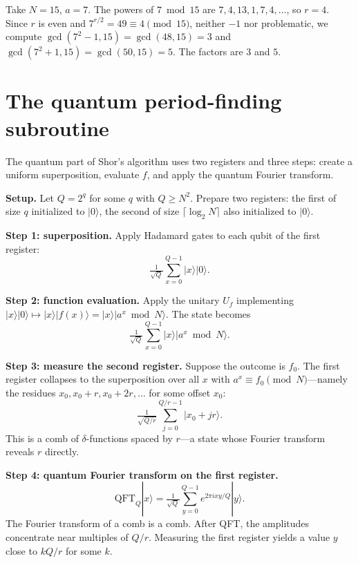 \begin{example}
Take $N = 15$, $a = 7$. The powers of $7 \bmod 15$ are $7, 4, 13, 1, 7, 4, \ldots$, so $r = 4$. Since $r$ is even and $7^{r/2} = 49 \equiv 4 \pmod{15}$, neither $-1$ nor problematic, we compute $\gcd(7^2 - 1, 15) = \gcd(48, 15) = 3$ and $\gcd(7^2+1, 15) = \gcd(50, 15) = 5$. The factors are $3$ and $5$.
\end{example}

\section{The quantum period-finding subroutine}

The quantum part of Shor's algorithm uses two registers and three steps: create a uniform superposition, evaluate $f$, and apply the quantum Fourier transform.

\textbf{Setup.} Let $Q = 2^q$ for some $q$ with $Q \geq N^2$. Prepare two registers: the first of size $q$ initialized to $|0\rangle$, the second of size $\lceil\log_2 N\rceil$ also initialized to $|0\rangle$.

\textbf{Step 1: superposition.} Apply Hadamard gates to each qubit of the first register:
\[
  \tfrac{1}{\sqrt Q}\sum_{x=0}^{Q-1} |x\rangle|0\rangle.
\]

\textbf{Step 2: function evaluation.} Apply the unitary $U_f$ implementing $|x\rangle|0\rangle \mapsto |x\rangle|f(x)\rangle = |x\rangle|a^x \bmod N\rangle$. The state becomes
\[
  \tfrac{1}{\sqrt Q}\sum_{x=0}^{Q-1} |x\rangle|a^x \bmod N\rangle.
\]

\textbf{Step 3: measure the second register.} Suppose the outcome is $f_0$. The first register collapses to the superposition over all $x$ with $a^x \equiv f_0 \pmod{N}$---namely the residues $x_0, x_0+r, x_0+2r, \ldots$ for some offset $x_0$:
\[
  \tfrac{1}{\sqrt{Q/r}}\sum_{j=0}^{Q/r - 1} |x_0 + jr\rangle.
\]
This is a comb of $\delta$-functions spaced by $r$---a state whose Fourier transform reveals $r$ directly.

\textbf{Step 4: quantum Fourier transform on the first register.}
\[
  \mathrm{QFT}_Q|x\rangle = \tfrac{1}{\sqrt Q}\sum_{y=0}^{Q-1} e^{2\pi i xy/Q}|y\rangle.
\]
The Fourier transform of a comb is a comb. After QFT, the amplitudes concentrate near multiples of $Q/r$. Measuring the first register yields a value $y$ close to $kQ/r$ for some $k$.

